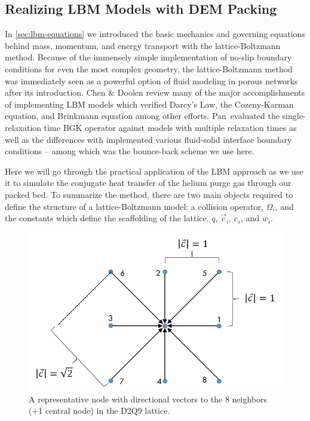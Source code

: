\subsection{Realizing LBM Models with DEM Packing}
In \cref{sec:lbm-equations} we introduced the basic mechanics and governing equations behind mass, momentum, and energy transport with the lattice-Boltzmann method. Because of the immensely simple implementation of no-slip boundary conditions for even the most complex geometry, the lattice-Boltzmann method was immediately seen as a powerful option of fluid modeling in porous networks after its introduction. Chen \& Doolen review many of the major accomplishments of implementing LBM models which verified Darcy's Law, the Cozeny-Karman equation, and Brinkmann equation among other efforts.\cite{Chen1998a} Pan\etal~evaluated the single-relaxation time BGK operator against models with multiple relaxation times as well as the differences with implemented various fluid-solid interface boundary conditions -- among which was the bounce-back scheme we use here.\cite{Pan2006}

Here we will go through the practical application of the LBM approach as we use it to simulate the conjugate heat transfer of the helium purge gas through our packed bed. To summarize the method, there are two main objects required to define the structure of a lattice-Boltzmann model: a collision operator, $\Omega_i$, and the constants which define the scaffolding of the lattice, $q$, $\vec{c}_i$, $c_s$, and $w_i$.

\begin{figure}[ht]
	\centering
	\includegraphics[width=\singleimagewidth]{chapters/figures/lbm/d2q9-lattice.png}
	\caption{A representative node with directional vectors to the 8 neighbors (+1 central node) in the D2Q9 lattice.}\label{fig:d2q9-lattice}
\end{figure}

